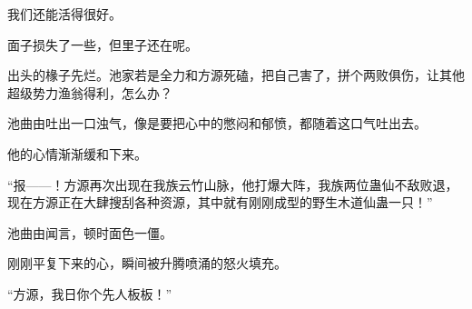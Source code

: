 \begin{this_body}
我们还能活得很好。

面子损失了一些，但里子还在呢。

出头的椽子先烂。池家若是全力和方源死磕，把自己害了，拼个两败俱伤，让其他超级势力渔翁得利，怎么办？

池曲由吐出一口浊气，像是要把心中的憋闷和郁愤，都随着这口气吐出去。

他的心情渐渐缓和下来。

“报——！方源再次出现在我族云竹山脉，他打爆大阵，我族两位蛊仙不敌败退，现在方源正在大肆搜刮各种资源，其中就有刚刚成型的野生木道仙蛊一只！”

池曲由闻言，顿时面色一僵。

刚刚平复下来的心，瞬间被升腾喷涌的怒火填充。

“方源，我日你个先人板板！”

\end{this_body}

